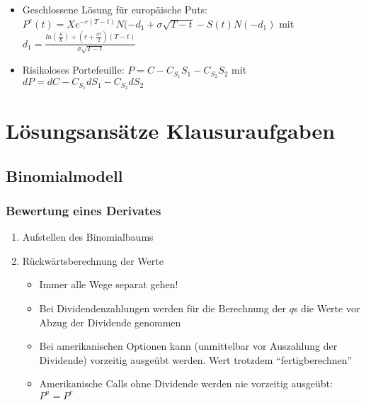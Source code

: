 \begin{itemize}
\begin{itemize}
\begin{itemize}
			\item Geschlossene Lösung für europäische Puts: \(P^e(t) = Xe^{-r(T-t)}N(-d_1+\sigma\sqrt{T-t}-S(t)N(-d_1)\) mit \(d_1 = \frac{ln(\frac{S}{X})+(r+\frac{\sigma^2}{2})(T-t)}{\sigma\sqrt{T-t}}\)
			\item Risikoloses Portefeuille: \(P=C-C_{S_1}S_1-C_{S_2}S_2\) mit \(dP=dC-C_{S_1}dS_1-C_{S_2}dS_2\)
		\end{itemize}
	\end{itemize}
\end{itemize}



\section{Lösungsansätze Klausuraufgaben}

\subsection{Binomialmodell}

\subsubsection{Bewertung eines Derivates}
\begin{enumerate}
	\item Aufstellen des Binomialbaums
	\item Rückwärtsberechnung der Werte
	\begin{itemize}
		\item Immer alle Wege separat gehen!
		\item Bei Dividendenzahlungen werden für die Berechnung der \(q\)s die Werte vor Abzug der Dividende genommen
		\item Bei amerikanischen Optionen kann (unmittelbar vor Auszahlung der Dividende) vorzeitig ausgeübt werden. Wert trotzdem "`fertigberechnen"'
		\item Amerikanische Calls ohne Dividende werden nie vorzeitig ausgeübt: \(P^a=P^e\)
	\end{itemize}
\end{enumerate}

